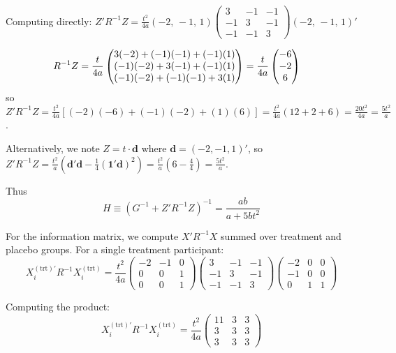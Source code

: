 \documentclass[
]{article}
\begin{document}
Computing directly: \(Z'R^{-1}Z = \frac{t^2}{4a}(-2,\,-1,\,1)
\begin{pmatrix} 3&-1&-1 \\ -1&3&-1 \\ -1&-1&3
\end{pmatrix}
(-2,\,-1,\,1)'\)

\begin{align}
  R^{-1}Z &= \frac{t}{4a}\begin{pmatrix}
    3(-2)+(-1)(-1)+(-1)(1) \\
    (-1)(-2)+3(-1)+(-1)(1) \\
    (-1)(-2)+(-1)(-1)+3(1)
  \end{pmatrix}
  = \frac{t}{4a}\begin{pmatrix}
    -6 \\ -2 \\ 6
  \end{pmatrix}
  \notag
\end{align} so \(Z'R^{-1}Z = \frac{t^2}{4a}
[(-2)(-6)+(-1)(-2)+(1)(6)] = \frac{t^2}{4a}(12+2+6)
= \frac{20t^2}{4a} = \frac{5t^2}{a}\).

Alternatively, we note \(Z = t \cdot \mathbf{d}\) where
\(\mathbf{d} = (-2,-1,1)'\), so \(Z'R^{-1}Z =
\frac{t^2}{a}(\mathbf{d}'\mathbf{d} -
\frac{1}{4}(\mathbf{1}'\mathbf{d})^2) =
\frac{t^2}{a}(6 - \frac{4}{4}) = \frac{5t^2}{a}\).

Thus \begin{equation}
  H \equiv (G^{-1}+Z'R^{-1}Z)^{-1}
  = \frac{ab}{a + 5bt^2}
\end{equation}

For the information matrix, we compute \(X'R^{-1}X\) summed over
treatment and placebo groups. For a single treatment participant: \[
  X_i^{(\text{trt})\prime} R^{-1} X_i^{(\text{trt})}
  = \frac{t^2}{4a}\begin{pmatrix}
    -2 & -1 & 0 \\ 0 & 0 & 1 \\ 0 & 0 & 1
  \end{pmatrix}
  \begin{pmatrix}
    3&-1&-1\\-1&3&-1\\-1&-1&3
  \end{pmatrix}
  \begin{pmatrix}
    -2&0&0\\-1&0&0\\0&1&1
  \end{pmatrix}
\]

Computing the product: \begin{equation}
  X_i^{(\text{trt})\prime} R^{-1} X_i^{(\text{trt})}
  = \frac{t^2}{4a}\begin{pmatrix}
    11 & 3 & 3 \\ 3 & 3 & 3 \\ 3 & 3 & 3
  \end{pmatrix}
\end{equation}
\end{document}
